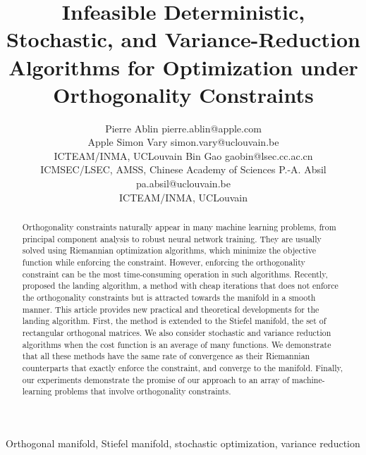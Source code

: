 \documentclass[twoside,11pt]{article}
\newcommand{\revision}[1]{{#1}}
\begin{document}
\title{Infeasible Deterministic, Stochastic, and Variance-Reduction Algorithms for Optimization under Orthogonality Constraints}
%

\author{\name Pierre Ablin \email pierre.ablin@apple.com \\
       \addr Apple
       \AND
       \name Simon Vary \email simon.vary@uclouvain.be\\
       \addr ICTEAM/INMA, UCLouvain
       \AND
       \name Bin Gao \email gaobin@lsec.cc.ac.cn \\
       \addr ICMSEC/LSEC, AMSS, Chinese Academy of Sciences
       \AND
       \name P.-A. Absil \email pa.absil@uclouvain.be \\
       \addr ICTEAM/INMA, UCLouvain
       }

\editor{}

\maketitle

\begin{abstract}%
Orthogonality constraints naturally appear in many machine learning problems, from principal component analysis to robust neural network training. They are usually solved using Riemannian optimization algorithms, which minimize the objective function while enforcing the constraint.
However, enforcing the orthogonality constraint can be the most time-consuming operation in such algorithms. 
Recently, \citet{ablin2022fast} proposed the landing algorithm, a method with cheap iterations that does not enforce the orthogonality constraints but is attracted towards the manifold in a smooth manner.
This article provides new practical and theoretical developments for the landing algorithm.
First, the method is extended to the Stiefel manifold, the set of rectangular orthogonal matrices. We also consider stochastic and variance reduction algorithms when the cost function is an average of many functions.
We demonstrate that all these methods have the same rate of convergence as their Riemannian counterparts that exactly enforce the constraint, \revision{and converge to the manifold}.
Finally, our experiments demonstrate the promise of our approach to an array of machine-learning problems that involve orthogonality constraints.
\end{abstract}

\begin{keywords}
  Orthogonal manifold, Stiefel manifold, stochastic optimization, variance reduction
\end{keywords}
\end{document}
